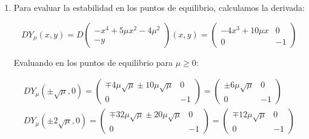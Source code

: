 \begin{exmp}
\begin{enumerate}
\begin{enumerate}
			\item $\mu = 0 \Rightarrow $ el origen es el único punto de equilibrio
			
			\item $0 < \mu \Rightarrow   \{(-2\sqrt{\mu},0); (-\sqrt{\mu},0);(2\sqrt{\mu},0); (\sqrt{\mu},0) \} $ son los 4 puntos de equilibrio.
		\end{enumerate}
		
		Como la equivalencia topológica preserva los puntos de equilibrio, no puede darse, por tanto, el campo es no es topológicamente equivalente para $\mu \neq 0$ y $\mu= 0$, luego es estructuralmente inestable y, en particular, atraviesa una bifurcación en $\mu = 0$.
		
		\item  Para evaluar la estabilidad en los puntos de equilibrio, calculamos la derivada:
		
		\begin{equation*}
			DY_\mu (x,y) = D\begin{pmatrix}
				-x^4+5\mu x^2 - 4 \mu^2\\
				-y
			\end{pmatrix}(x,y) = \begin{pmatrix}
			-4x^3+10\mu x & 0\\
			0 & -1
			\end{pmatrix}
		\end{equation*}
		
		Evaluando en los puntos de equilibrio para $\mu \geq 0$:
		
		\begin{align*}
			DY_\mu (\pm\sqrt{\mu},0) =  \begin{pmatrix}
				\mp 4 \mu \sqrt{\mu}\pm 10\mu\sqrt{\mu} & 0\\
				0 & -1
			\end{pmatrix} = \begin{pmatrix}
			\pm6\mu\sqrt{\mu} & 0\\
			0 & -1
			\end{pmatrix} \\
			DY_\mu (\pm2\sqrt{\mu},0) =  \begin{pmatrix}
				\mp 32 \mu \sqrt{\mu}\pm 20\mu\sqrt{\mu} & 0\\
				0 & -1
			\end{pmatrix} = \begin{pmatrix}
				\mp 12 \mu\sqrt{\mu} & 0\\
				0 & -1
			\end{pmatrix} 
		\end{align*}
		

\end{enumerate}
\end{exmp}
